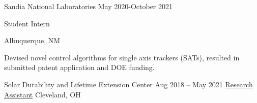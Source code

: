 \documentclass[10pt]{article}
\begin{document}
{    
\vspace{0.25cm}

	\job
{Sandia National Laboratories}
{May 2020-October 2021}
{
	
	Student Intern
}
{Albuquerque, NM}
\


{\begin{newitemize}
		\item Devised novel control algorithms for single axis trackers (SATs), resulted in submitted patent application and DOE funding.
\end{newitemize}}


\vspace{0.25cm}
	\job
	{Solar Durability and Lifetime Extension Center}
	{Aug 2018 – May 2021}
	{\href{https://engineering.case.edu/centers/sdle/ben-pierce}{Research Assistant}}
	{Cleveland, OH}
	\
	
}
\end{document}
